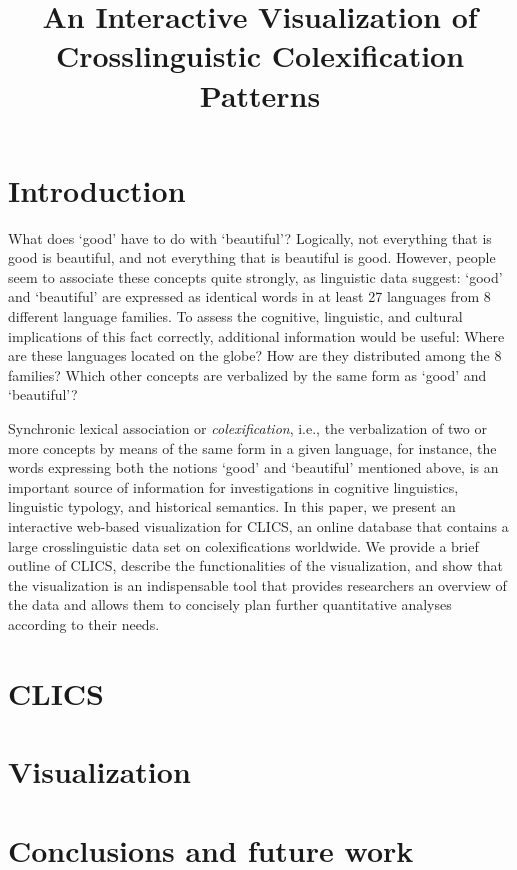 \documentclass[10pt, a4paper]{article}
\title{An Interactive Visualization of Crosslinguistic Colexification Patterns}
\begin{document}
\maketitleabstract

\section{Introduction}

What does `good' have to do with `beautiful'? Logically, not everything that is good is beautiful, and not everything that is beautiful is good. However, people seem to associate these concepts quite strongly, as linguistic data suggest: `good' and `beautiful' are expressed as identical words in at least 27 languages from 8 different language families. To assess the cognitive, linguistic, and cultural implications of this fact correctly, additional information would be useful: Where are these languages located on the globe? How are they distributed among the 8 families? Which other concepts are verbalized by the same form as `good' and `beautiful'?

Synchronic lexical association or \textsl{colexification}, i.e., the verbalization of two or more concepts by means of the same form in a given language, for instance, the words expressing both the notions `good' and `beautiful' mentioned above, is an important source of information for investigations in cognitive linguistics, linguistic typology, and historical semantics. In this paper, we present an interactive web-based visualization for CLICS, an online database that contains a large crosslinguistic data set on colexifications worldwide. We provide a brief outline of CLICS, describe the functionalities of the visualization, and show that the visualization is an indispensable tool that provides researchers an overview of the data and allows them to concisely plan further quantitative analyses according to their needs.

\section{CLICS}



\section{Visualization}



\section{Conclusions and future work}
\end{document}

